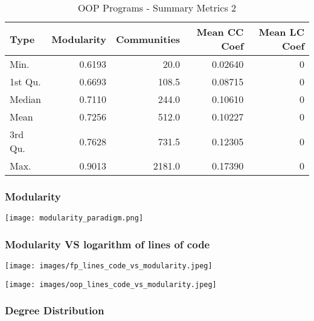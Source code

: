 \documentclass[12pt, a4paper]{article}
\begin{document}
\begin{longtable}[H]{l r r r r}
    \caption{OOP Programs - Summary Metrics 2}\label{table:oop_sum_metrics_2}\\
        Type & Modularity & Communities & Mean CC Coef & Mean LC Coef \\
        \hline            
        \endhead
        Min.    & 0.6193 &   20.0 & 0.02640 & 0 \\    
        1st Qu. & 0.6693 &  108.5 & 0.08715 & 0 \\    
        Median  & 0.7110 &  244.0 & 0.10610 & 0 \\    
        Mean    & 0.7256 &  512.0 & 0.10227 & 0 \\    
        3rd Qu. & 0.7628 &  731.5 & 0.12305 & 0 \\    
        Max.    & 0.9013 & 2181.0 & 0.17390 & 0 
\end{longtable}

\subsubsection{Modularity}

\begin{minipage}[t]{\linewidth}
    \texttt{[image: modularity\_paradigm.png]}
    \captionsetup{type=figure}
    \label{fig:modularity_paradigm}
  \end{minipage}


\subsubsection{Modularity VS logarithm of lines of code}


\begin{minipage}[t]{\linewidth}
    \texttt{[image: images/fp\_lines\_code\_vs\_modularity.jpeg]}
    \captionsetup{type=figure}
    \label{fig:fp_log_lines_mod}
  \end{minipage}
  
  \begin{minipage}[t]{\linewidth}
    \texttt{[image: images/oop\_lines\_code\_vs\_modularity.jpeg]}
    \captionsetup{type=figure}
    \label{fig:oop_log_lines_mod}
  \end{minipage}

\subsubsection{Degree Distribution}
  
\end{document}
